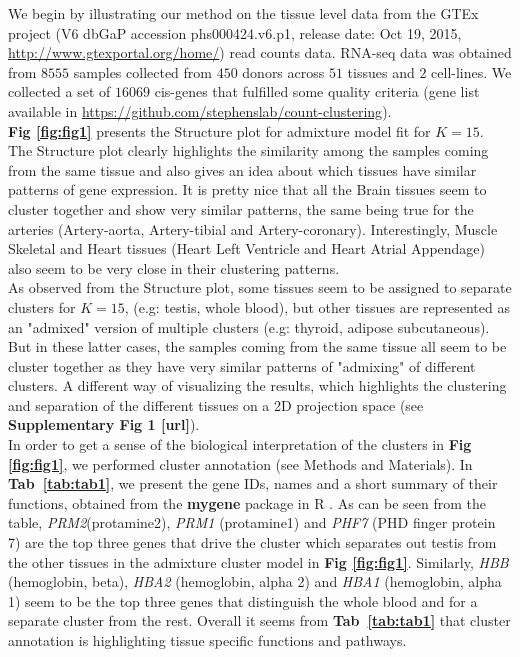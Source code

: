 We begin by illustrating our method on the tissue level data from the  GTEx project (V6 dbGaP accession phs000424.v6.p1, release date: Oct 19, 2015, \url{http://www.gtexportal.org/home/}) read counts data.  RNA-seq data was obtained from $8555$ samples collected from $450$ donors across $51$ tissues and $2$ cell-lines. We collected a set of $16069$ cis-genes that fulfilled some quality criteria (gene list available in \url{https://github.com/stephenslab/count-clustering}).  \\[1 pt]
 \textbf{Fig \ref{fig:fig1}} presents the Structure plot for admixture model fit for $K=15$. The Structure plot clearly highlights the similarity among the samples coming from the same tissue and also gives an idea about which tissues have similar patterns of gene expression. It is  pretty nice that all the Brain tissues seem to cluster together and show very similar patterns, the same being true for the arteries (Artery-aorta, Artery-tibial and Artery-coronary). Interestingly, Muscle Skeletal and Heart tissues (Heart Left Ventricle and Heart Atrial Appendage) also seem to be very close in their clustering patterns. \\[1 pt]
 As observed from the Structure plot, some tissues seem to be assigned to separate clusters for $K=15$, (e.g: testis, whole blood), but other tissues are represented as an "admixed" version of multiple clusters (e.g: thyroid, adipose subcutaneous). But in these latter cases, the samples coming from the same tissue all seem to be cluster together as they have very similar patterns of "admixing" of different clusters. A different way of visualizing the results, which highlights the clustering and separation of the different tissues on a 2D projection space (see \textbf{Supplementary Fig 1 [url]}). \\[1 pt]
 In order to get a sense of the biological interpretation of the clusters in  \textbf{Fig \ref{fig:fig1}}, we performed cluster annotation (see Methods and Materials). In \textbf{Tab~\ref{tab:tab1}}, we present the gene IDs, names and a short summary of their functions, obtained from the \textbf{mygene} package in R \cite{Thompson2014}. As can be seen from the table, \textit{PRM2}(protamine2), \textit{PRM1} (protamine1) and \textit{PHF7} (PHD finger protein 7) are the  top three genes that drive the cluster which separates out testis from the other tissues in the admixture cluster model in \textbf{Fig \ref{fig:fig1}}. Similarly, \textit{HBB} (hemoglobin, beta), \textit{HBA2} (hemoglobin, alpha 2) and \textit{HBA1} (hemoglobin, alpha 1) seem to be the top three genes that distinguish the whole blood and for a separate cluster from the rest. Overall it seems from \textbf{Tab~\ref{tab:tab1}} that cluster annotation is highlighting tissue specific functions and pathways.\\[2 pt]

